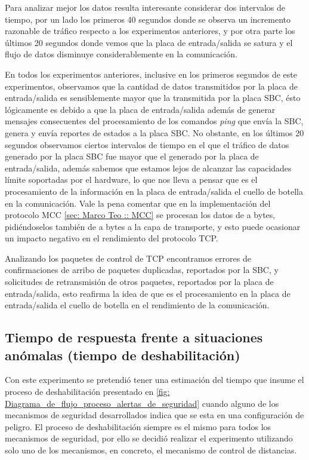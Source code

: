 \documentclass[withindex,glossary]{cam-thesis}
\begin{document}
Para analizar mejor los datos resulta interesante considerar dos intervalos de tiempo, por un lado los primeros 40 segundos donde se observa un incremento razonable de tráfico respecto a los experimentos anteriores, y por otra parte los últimos 20 segundos donde vemos que  la placa de entrada/salida se satura y el flujo de datos disminuye considerablemente en la comunicación.

En todos los experimentos anteriores, inclusive en los primeros segundos de este experimentos, observamos que la cantidad de datos transmitidos por la placa de entrada/salida es sensiblemente mayor que la transmitida por la placa SBC, ésto lógicamente es debido a que la placa de entrada/salida además de generar mensajes consecuentes del procesamiento de los comandos \textit{ping} que envía la SBC, genera y envía reportes de estados a la placa SBC. 
No obstante, en los últimos 20 segundos observamos ciertos intervalos de tiempo en el que el tráfico de datos generado por la placa SBC fue mayor que el generado por la placa de entrada/salida, además sabemos que estamos lejos de alcanzar las capacidades límite soportadas por el hardware, lo que nos lleva a pensar que es el procesamiento de la información en la placa de entrada/salida el cuello de botella en la comunicación. Vale la pena comentar que en la implementación del protocolo MCC \ref{sec: Marco Teo :: MCC} se procesan los datos de a bytes, pidiéndoselos también de a bytes a la capa de transporte, y esto puede ocasionar un impacto negativo en el rendimiento del protocolo TCP.

Analizando los paquetes de control de TCP encontramos errores de confirmaciones de arribo de paquetes duplicadas, reportados por la SBC, y solicitudes de retransmisión de otros paquetes, reportados por la placa de entrada/salida, esto reafirma la idea de que es el procesamiento en la placa de entrada/salida el cuello de botella en el rendimiento de la comunicación.



\subsection{Tiempo de respuesta frente a situaciones anómalas (tiempo de deshabilitación)}
Con este experimento se pretendió tener una estimación del tiempo que insume el proceso de deshabilitación presentado en \ref{fig: Diagrama_de_flujo_proceso_alertas_de_seguridad} cuando alguno de los mecanismos de seguridad desarrollados indica que se esta en una configuración de peligro. El proceso de deshabilitación siempre es el mismo para todos los mecanismos de seguridad, por ello se decidió realizar el experimento utilizando solo uno de los mecanismos, en concreto, el mecanismo de control de distancias.
\end{document}
